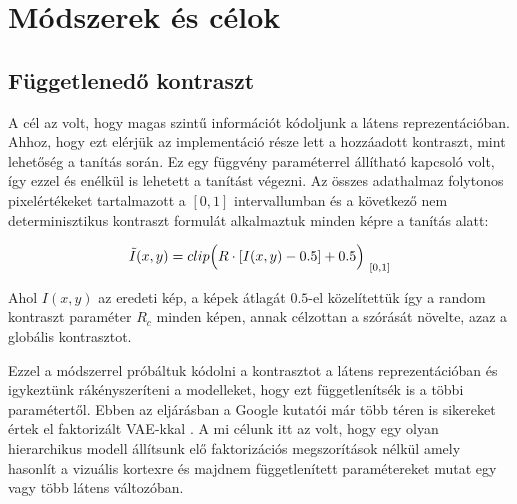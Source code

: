 \documentclass[12pt, english]{article}
\begin{document}
\newpage

\section{Módszerek és célok}

\vspace{7mm}

\subsection{Függetlenedő kontraszt}

\vspace{5mm}

\par A cél az volt, hogy magas szintű információt kódoljunk a látens reprezentációban. Ahhoz, hogy ezt elérjük az implementáció része lett a hozzáadott kontraszt, mint lehetőség a tanítás során. Ez egy függvény paraméterrel állítható kapcsoló volt, így ezzel és enélkül is lehetett a tanítást végezni. Az összes adathalmaz folytonos pixelértékeket tartalmazott a $[0, 1]$ intervallumban és a következő nem determinisztikus kontraszt formulát alkalmaztuk minden képre a tanítás alatt:

\vspace{4mm}

\begin{equation}
    \Tilde{I}(x, y) = clip\Big(R \cdot [I(x, y) - 0.5] + 0.5\Big)_{\ [0, 1]}
\end{equation}

\vspace{4mm}

\par Ahol $I(x, y)$ az eredeti kép, a képek átlagát $0.5$-el közelítettük így a random kontraszt paraméter $R_c$ minden képen, annak célzottan a szórását növelte, azaz a globális kontrasztot.

\vspace{4mm}

\par Ezzel a módszerrel próbáltuk kódolni a kontrasztot a látens reprezentációban és igykeztünk rákényszeríteni a modelleket, hogy ezt függetlenítsék is a többi paramétertől. Ebben az eljárásban a Google kutatói már több téren is sikereket értek el faktorizált VAE-kkal \cite{locatello2018challenging}. A mi célunk itt az volt, hogy egy olyan hierarchikus modell állítsunk elő faktorizációs megszorítások nélkül amely hasonlít a vizuális kortexre és majdnem függetlenített paramétereket mutat egy vagy több látens változóban.
\end{document}
